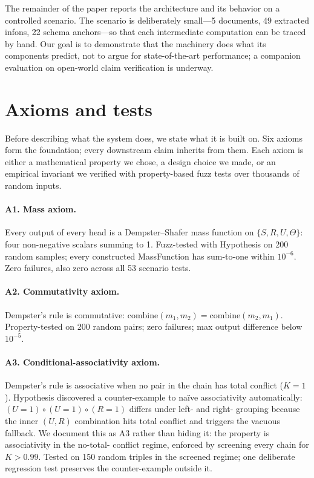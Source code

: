 \documentclass[11pt,a4paper]{article}
\begin{document}
The remainder of the paper reports the architecture and its
behavior on a controlled scenario. The scenario is deliberately
small---5 documents, 49 extracted infons, 22 schema anchors---so
that each intermediate computation can be traced by hand. Our
goal is to demonstrate that the machinery does what its components
predict, not to argue for state-of-the-art performance; a
companion evaluation on open-world claim verification is underway.

\section{Axioms and tests}

Before describing what the system does, we state what it is built
on. Six axioms form the foundation; every downstream claim
inherits from them. Each axiom is either a mathematical property
we chose, a design choice we made, or an empirical invariant we
verified with property-based fuzz tests over thousands of random
inputs.

\paragraph{A1. Mass axiom.} Every output of every head is a
Dempster--Shafer mass function on $\{S, R, U, \Theta\}$: four
non-negative scalars summing to 1. Fuzz-tested with Hypothesis on
200 random samples; every constructed MassFunction has sum-to-one
within $10^{-6}$. Zero failures, also zero across all 53 scenario
tests.

\paragraph{A2. Commutativity axiom.} Dempster's rule is
commutative: $\text{combine}(m_1, m_2) = \text{combine}(m_2, m_1)$.
Property-tested on 200 random pairs; zero failures; max output
difference below $10^{-5}$.

\paragraph{A3. Conditional-associativity axiom.} Dempster's rule
is associative when no pair in the chain has total conflict
($K = 1$). Hypothesis discovered a counter-example to naïve
associativity automatically:
$(U=1) \circ (U=1) \circ (R=1)$ differs under left- and right-
grouping because the inner $(U, R)$ combination hits total conflict
and triggers the vacuous fallback. We document this as A3 rather
than hiding it: the property is associativity in the no-total-
conflict regime, enforced by screening every chain for
$K > 0.99$. Tested on 150 random triples in the screened regime;
one deliberate regression test preserves the counter-example
outside it.
\end{document}
